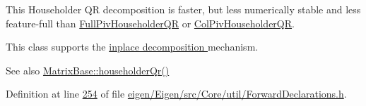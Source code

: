 This Householder QR decomposition is faster, but less numerically stable and less feature-\/full than \hyperlink{group___q_r___module_class_eigen_1_1_full_piv_householder_q_r}{Full\+Piv\+Householder\+QR} or \hyperlink{group___q_r___module_class_eigen_1_1_col_piv_householder_q_r}{Col\+Piv\+Householder\+QR}.

This class supports the \hyperlink{group___inplace_decomposition}{inplace decomposition } mechanism.

\begin{DoxySeeAlso}{See also}
\hyperlink{group___core___module_a9a9377aab1cea26db5f25bab7e682f8f}{Matrix\+Base\+::householder\+Qr()} 
\end{DoxySeeAlso}


Definition at line \hyperlink{eigen_2_eigen_2src_2_core_2util_2_forward_declarations_8h_source_l00254}{254} of file \hyperlink{eigen_2_eigen_2src_2_core_2util_2_forward_declarations_8h_source}{eigen/\+Eigen/src/\+Core/util/\+Forward\+Declarations.\+h}.

